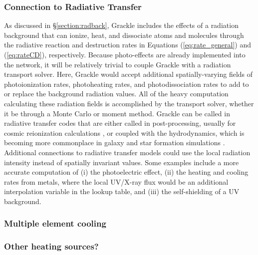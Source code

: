\subsubsection{Connection to Radiative Transfer}

As discussed in \S\ref{section:radback}, Grackle includes the effects
of a radiation background that can ionize, heat, and dissociate atoms
and molecules through the radiative reaction and destruction rates in
Equations (\ref{eq:rate_general}) and (\ref{eq:rateCD}), respectively.
Because photo-effects are already implemented into the network, it will
be relatively trivial to couple Grackle with a radiation transport
solver.  Here, Grackle would accept additional spatially-varying
fields of photoionization rates, photoheating rates, and
photodissociation rates to add to or replace the background radiation
values.  All of the heavy computation calculating these radiation
fields is accomplished by the transport solver, whether it be through
a Monte Carlo or moment method.  Grackle can be called in radiative
transfer codes that are either called in post-processing, usually for
cosmic reionization calculations \citep[e.g.][]{2014MNRAS.439..725I,
  2016MNRAS.459.2342M}, or coupled with the hydrodynamics, which is
becoming more commonplace in galaxy and star formation simulations
\citep[e.g.][]{2014MNRAS.442.2560W, 2015MNRAS.451...34R,
  2015arXiv151100011O, 2015MNRAS.454..380B, 2016arXiv160300034P, 2016arXiv160703117R}.
Additional connections to radiative transfer models could use the
local radiation intensity instead of spatially invariant values.  Some
examples include a more accurate computation of (i) the photoelectric
effect, (ii) the heating and cooling rates from metals, where the
local UV/X-ray flux would be an additional interpolation variable in
the lookup table, and (iii) the self-shielding of a UV background.

\subsubsection{Multiple element cooling}

\subsubsection{Other heating sources?}

